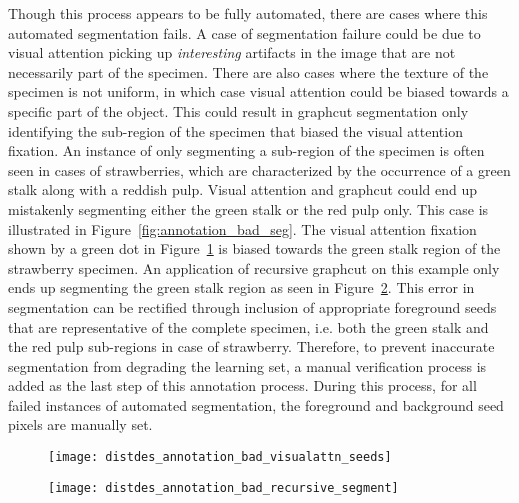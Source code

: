 Though this process appears to be fully automated, there are cases where this automated segmentation fails. A case of segmentation failure could be due to visual attention picking up \emph{interesting} artifacts in the image that are not necessarily part of the specimen. There are also cases where the texture of the specimen is not uniform, in which case visual attention could be biased towards a specific part of the object. This could result in graphcut segmentation only identifying the sub-region of the specimen that biased the visual attention fixation. An instance of only segmenting a sub-region of the specimen is often seen in cases of strawberries, which are characterized by the occurrence of a green stalk along with a reddish pulp. Visual attention and graphcut could end up mistakenly segmenting either the green stalk or the red pulp only. This case is illustrated in Figure~\ref{fig:annotation_bad_seg}. The visual attention fixation shown by a green dot in Figure~\ref{fig:bad_seg_visualattn_seeds} is 
biased towards the green stalk region of the strawberry specimen. An application of recursive graphcut on this example only ends up segmenting the green stalk region as seen in Figure~\ref{fig:bad_seg_recursive_seg}. This error in segmentation can be rectified through inclusion of appropriate foreground seeds that are representative of the complete specimen, i.e. both the green stalk and the red pulp sub-regions in case of strawberry. Therefore, to prevent inaccurate segmentation from degrading the learning set, a manual verification process is added as the last step of this annotation process. During this process, for all failed instances of automated segmentation, the foreground and background seed pixels are manually set. 
%
\begin{figure*}
  \centering
  \begin{subfigure}[]{0.2\textwidth}
      \texttt{[image: distdes\_annotation\_bad\_visualattn\_seeds]}
      \caption{}
      \label{fig:bad_seg_visualattn_seeds}
  \end{subfigure}
  \begin{subfigure}[]{0.2\textwidth}
      \texttt{[image: distdes\_annotation\_bad\_recursive\_segment]}
      \caption{}
      \label{fig:bad_seg_recursive_seg}
  \end{subfigure}
\caption[Illustration of a case where automated annotation process fails]{An illustration of a case where automated annotation process fails, and human verification and correction is required. The visual attention fixation shown as a green dot in () is biased towards the green stalk region of the strawberry. Since this strawberry specimen exhibits binary texture--green stalk and red pulp, the combined visual attention and graphcut automated annotation approach ends up segmenting only the stalk sub-region of this strawberry specimen (see ()). Such cases of failure calls for human verification and correction of foreground seeds to enable graphcut algorithm to segment the whole strawberry specimen.} 
\label{fig:annotation_bad_seg}
\end{figure*}	
%

